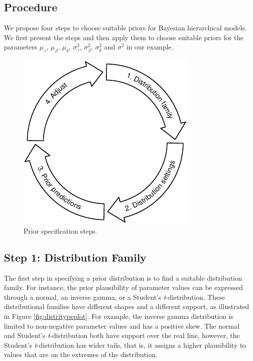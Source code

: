 \documentclass[
  english,
  doc,floatsintext]{apa6}
\begin{document}
\hypertarget{procedure}{%
\subsection{Procedure}\label{procedure}}

We propose four steps to choose suitable priors for Bayesian hierarchical models. We first present the steps and then apply them to choose suitable priors for the parameters \(\mu_{\gamma}\), \(\mu_{\beta}\), \(\mu_{\delta}\), \(\sigma_{\gamma}^2\), \(\sigma_{\beta}^2\), \(\sigma_{\delta}^2\) and \(\sigma^2\) in our example.

\begin{figure}[H]

{\centering \includegraphics{manuscript_files/figure-latex/distributionsteps-1} 

}

\caption{Prior specification steps.}\label{fig:distributionsteps}
\end{figure}

\hypertarget{step-1-distribution-family}{%
\subsection{Step 1: Distribution Family}\label{step-1-distribution-family}}

The first step in specifying a prior distribution is to find a suitable distribution family. For instance, the prior plausibility of parameter values can be expressed through a normal, an inverse gamma, or a Student's \emph{t}-distribution. These distributional families have different shapes and a different support, as illustrated in Figure \ref{fig:distritypeplot}. For example, the inverse gamma distribution is limited to non-negative parameter values and has a positive skew. The normal and Student's \emph{t}-distribution both have support over the real line, however, the Student's \emph{t}-distribution has wider tails, that is, it assigns a higher plausibility to values that are on the extremes of the distribution.
\end{document}
